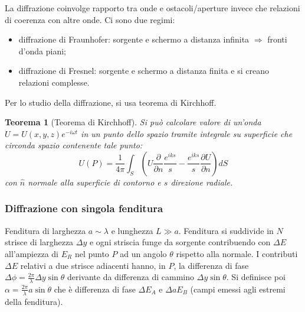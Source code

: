 \documentclass[10pt, a4paper]{scrartcl}
\numberwithin{equation}{subsection}
\theoremstyle{style1}
\newtheorem{teorema}{Teorema}[section]
\begin{document}
La diffrazione coinvolge rapporto tra onde e ostacoli/aperture invece che relazioni di coerenza con altre onde. Ci sono due regimi:
\begin{itemize}
	\item diffrazione di Fraunhofer: sorgente e schermo a distanza infinita $\Rightarrow $ fronti d'onda piani;
	\item diffrazione di Fresnel: sorgente e schermo a distanza finita e si creano relazioni complesse.
\end{itemize}
Per lo studio della diffrazione, si usa teorema di Kirchhoff.
\begin{teorema}
	[Teorema di Kirchhoff]
	Si pu\`o calcolare valore di un'onda $U=U(x,y,z) e^{-i\omega t} $ in un punto dello spazio tramite integrale su superficie che circonda spazio contenente tale punto:
	\begin{equation}
		U(P) = \frac{1}{4\pi} \int_{S}  \left(U \frac{\partial }{\partial n} \frac{e^{iks} }{s} - \frac{e^{iks} }{s}\frac{\partial U}{\partial n}  \right) dS
	\end{equation}
	con $\hat{n}$ normale alla superficie di contorno e $s$ direzione radiale.
\end{teorema}
\subsubsection{Diffrazione con singola fenditura}

Fenditura di larghezza $a\sim \lambda $ e lunghezza $L\gg a$. Fenditura si suddivide in $N$ strisce di larghezza $\Delta  y$ e ogni striscia funge da sorgente contribuendo con $\Delta E$ all'ampiezza di $E_R$ nel punto $P$ ad un angolo $\theta $ rispetto alla normale. I contributi $\Delta  E$ relativi a due strisce adiacenti hanno, in $P$, la differenza di fase $\Delta \phi  = \frac{2\pi}{\lambda }\Delta  y \sin \theta $ derivante da differenza di cammino $\Delta  y \sin \theta $. Si definisce poi $\alpha  = \frac{2\pi}{\lambda } a \sin \theta $ che \`e differenza di fase $\Delta E_A $ e $\Delta a E_B$ (campi emessi agli estremi della fenditura). 
\end{document}
